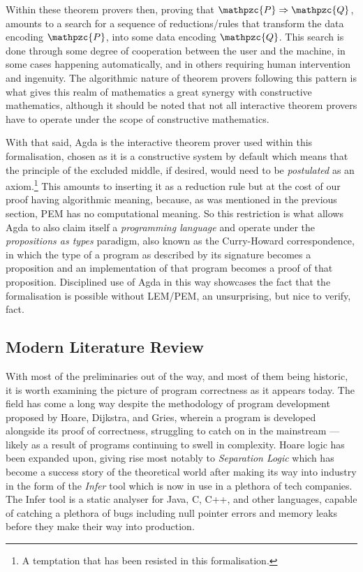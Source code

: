\documentclass[oneside,12pt]{article}
\newcommand{\textM}[1]{\ensuremath{\mathpzc{#1}}}
\begin{document}
Within these theorem provers then, proving that $\textM{P} \Rightarrow \textM{Q}$, amounts to a search for a sequence of reductions/rules that transform the data encoding \textM{P}, into some data encoding \textM{Q}. This search is done through some degree of cooperation between the user and the machine, in some cases happening automatically, and in others requiring human intervention and ingenuity. The algorithmic nature of theorem provers following this pattern is what gives this realm of mathematics a great synergy with constructive mathematics, although it should be noted that not all interactive theorem provers have to operate under the scope of constructive mathematics.


With that said, Agda\cite{norell2007towards} is the interactive theorem prover used within this formalisation, chosen as it is a constructive system by default which means that the principle of the excluded middle, if desired, would need to be \emph{postulated} as an axiom.\footnote{A temptation that has been resisted in this formalisation.} This amounts to inserting it as a reduction rule but at the cost of our proof having algorithmic meaning, because, as was mentioned in the previous section, PEM has no computational meaning. So this restriction is what allows Agda to also claim itself a \emph{programming language} and operate under the \emph{propositions as types} paradigm, also known as the Curry-Howard correspondence, in which the type of a program as described by its signature becomes a proposition and an implementation of that program becomes a proof of that proposition. Disciplined use of Agda in this way showcases the fact that the formalisation is possible without LEM/PEM, an unsurprising, but nice to verify, fact.


\subsection{Modern Literature Review}

With most of the preliminaries out of the way, and most of them being historic, it is worth examining the picture of program correctness as it appears today. The field has come a long way despite the methodology of program development proposed by Hoare, Dijkstra, and Gries, wherein a program is developed alongside its proof of correctness, struggling to catch on in the mainstream --- likely as a result of programs continuing to swell in complexity. Hoare logic has been expanded upon, giving rise most notably to \emph{Separation Logic} which has become a success story of the theoretical world after making its way into industry in the form of the \emph{Infer} tool which is now in use in a plethora of tech companies. The Infer tool is a static analyser for Java, C, C++, and other languages, capable of catching a plethora of bugs including null pointer errors and memory leaks before they make their way into production.
\end{document}

